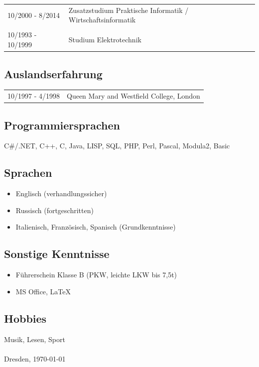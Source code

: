 \documentclass{article}
\begin{document}
\begin{tabular}{lp{15cm}}
10/2000 - 8/2014	& Zusatzstudium Praktische Informatik / Wirtschaftsinformatik\\
\\
10/1993 - 10/1999	& Studium Elektrotechnik\\
\end{tabular}


\subsection*{Auslandserfahrung}
  \begin{tabular}{lp{15cm}}
    10/1997 - 4/1998	& Queen Mary and Westfield College, London
  \end{tabular}
	
\subsection*{Programmiersprachen}
  C\#/.NET, C++, C, Java, LISP, SQL, PHP, Perl, Pascal, Modula2, Basic
		
\subsection*{Sprachen}
  \begin{itemize}
    \item{Englisch (verhandlungssicher)}
    \item{Russisch (fortgeschritten)}
    \item{Italienisch, Französisch, Spanisch (Grundkenntnisse)}
  \end{itemize}

\subsection*{Sonstige Kenntnisse}
  \begin{itemize}
    \item{F\"uhrerschein Klasse B (PKW, leichte LKW bis 7,5t)}
    \item{MS Office, \LaTeX{}}
  \end{itemize}

\subsection*{Hobbies}
Musik, Lesen, Sport\\
\\
Dresden, %
\today
\end{document}
